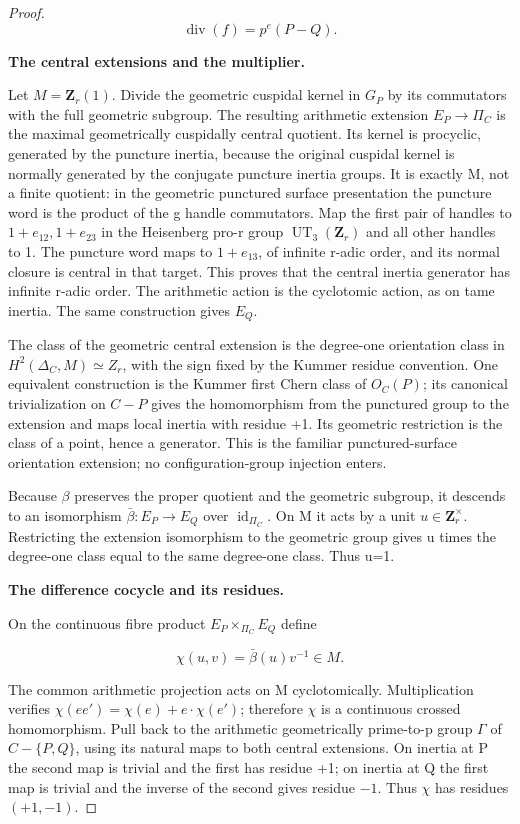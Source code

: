 \begin{proof}
\[\operatorname{div}(f)=p^e(P-Q).\]

\textbf{The central extensions and the multiplier.}

Let \(M=\mathbf{Z}_r(1)\). Divide the geometric cuspidal kernel in \(G_P\) by its commutators with the full geometric subgroup. The resulting arithmetic extension \(E_P{\to}{\Pi}_C\) is the maximal geometrically cuspidally central quotient. Its kernel is procyclic, generated by the puncture inertia, because the original cuspidal kernel is normally generated by the conjugate puncture inertia groups. It is exactly M, not a finite quotient: in the geometric punctured surface presentation the puncture word is the product of the g handle commutators. Map the first pair of handles to \(1+e_{12},1+e_{23}\) in the Heisenberg pro-r group \(\operatorname{UT}_3(\mathbf{Z}_r)\) and all other handles to 1. The puncture word maps to \(1+e_{13}\), of infinite r-adic order, and its normal closure is central in that target. This proves that the central inertia generator has infinite r-adic order. The arithmetic action is the cyclotomic action, as on tame inertia. The same construction gives \(E_Q\).

The class of the geometric central extension is the degree-one orientation class in \(H^2(\Delta_C,M)\simeq Z_r\), with the sign fixed by the Kummer residue convention. One equivalent construction is the Kummer first Chern class of \(O_C(P)\); its canonical trivialization on \(C-P\) gives the homomorphism from the punctured group to the extension and maps local inertia with residue +1. Its geometric restriction is the class of a point, hence a generator. This is the familiar punctured-surface orientation extension; no configuration-group injection enters.

Because \({\beta}\) preserves the proper quotient and the geometric subgroup, it descends to an isomorphism \(\bar\beta:E_P\to E_Q\) over \(\operatorname{id}_{{\Pi}_C}\). On M it acts by a unit \(u{\in}\mathbf{Z}_r^{\times}\). Restricting the extension isomorphism to the geometric group gives u times the degree-one class equal to the same degree-one class. Thus u=1.

\textbf{The difference cocycle and its residues.}

On the continuous fibre product \(E_P{\times}_{{\Pi}_C}E_Q\) define

\[\chi(u,v)=\bar\beta(u)v^{-1}\in M.\]

The common arithmetic projection acts on M cyclotomically. Multiplication verifies \(\chi(ee')=\chi(e)+e\cdot\chi(e')\); therefore \({\chi}\) is a continuous crossed homomorphism. Pull back to the arithmetic geometrically prime-to-p group \({\Gamma}\) of \(C-\{P,Q\}\), using its natural maps to both central extensions. On inertia at P the second map is trivial and the first has residue +1; on inertia at Q the first map is trivial and the inverse of the second gives residue \(-1\). Thus \({\chi}\) has residues \((+1,-1)\).


\end{proof}
